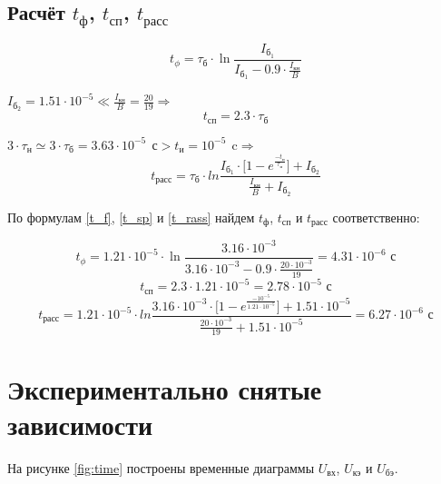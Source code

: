 \subsection{Расчёт $t_\text{ф}$, $t_\text{сп}$, $t_\text{расс}$}

\begin{equation}
\label{t_f}
t_\phi = \tau_{\text{б}} \cdot \ln{\frac{I_{\text{б}_1}}{I_{\text{б}_1} - 0.9 \cdot \frac{I_\text{кн}}{B}}}
\end{equation}

$I_{\text{б}_2} = 1.51 \cdot 10^{-5} \ll \frac{I_\text{кн}}{B} = \frac{20}{19} \Rightarrow$
\begin{equation}
\label{t_sp}
t_\text{сп} = 2.3 \cdot \tau_\text{б}
\end{equation}

$3 \cdot \tau_\text{н} \simeq 3 \cdot \tau_{\text{б}} = 3.63 \cdot 10^{-5}\ \ \text{с} > t_\text{и} = 10^{-5}\ \ \text{c} \Rightarrow$
\begin{equation}
\label{t_rass}
t_\text{расс} = \tau_{\text{б}} \cdot ln{\frac{I_{\text{б}_1} \cdot \Big [ 1 - e^{\frac{-t_\text{и}}{\tau_\text{н}}} \Big ] + I_{\text{б}_2}}{\frac{I_\text{кн}}{B} + I_{\text{б}_2}}}
\end{equation}

По формулам \ref{t_f}, \ref{t_sp} и \ref{t_rass} найдем $t_\text{ф}$, $t_\text{сп}$ и $t_\text{расс}$ соответственно:

\begin{displaymath}
t_\phi = 1.21 \cdot 10^{-5} \cdot \ln{\frac{3.16 \cdot 10^{-3}}{3.16 \cdot 10^{-3} - 0.9 \cdot \frac{20 \cdot 10^{-3}}{19}}} = 4.31 \cdot 10^{-6} \text{ с}
\end{displaymath}
\begin{displaymath}
t_\text{сп} = 2.3 \cdot 1.21 \cdot 10^{-5} = 2.78 \cdot 10^{-5} \text{ с}
\end{displaymath}
\begin{displaymath}
t_\text{расс} = 1.21 \cdot 10^{-5} \cdot ln{\frac{3.16 \cdot 10^{-3} \cdot \Big [ 1 - e^{\frac{-10^{-5}}{1.21 \cdot 10^{-5}}} \Big ] + 1.51 \cdot 10^{-5}}{\frac{20 \cdot 10^{-3}}{19} + 1.51 \cdot 10^{-5}}} = 6.27 \cdot 10^{-6} \text{ с}
\end{displaymath}

\section{Экспериментально снятые зависимости}

На рисунке \ref{fig:time} построены временные диаграммы $U_\text{вх}$, $U_\text{кэ}$ и $U_\text{бэ}$.

